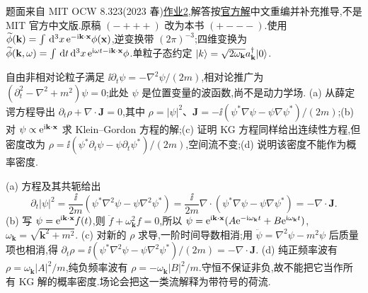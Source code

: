 题面来自 MIT OCW 8.323(2023 春)\href{https://ocw.mit.edu/courses/8-323-relativistic-quantum-field-theory-i-spring-2023/mit8_323_s23_pset02.pdf}{作业2},解答按\href{https://ocw.mit.edu/courses/8-323-relativistic-quantum-field-theory-i-spring-2023/mit8_323_s23_pset_02sol.pdf}{官方解}中文重编并补充推导,不是 MIT 官方中文版.原稿 $(-+++)$ 改为本书 $(+---)$.使用
$\widetilde\phi(\mathbf k)=\int\,\mathrm d^3x\,\mathrm e^{-\mathrm i\mathbf k\cdot\mathbf x}\phi(\mathbf x)$,逆变换带 $(2\pi)^{-3}$;四维变换为 $\widetilde\phi(\mathbf k,\omega)=\int\,\mathrm d t\,\mathrm d^3x\,\mathrm e^{\mathrm i\omega t-\mathrm i\mathbf k\cdot\mathbf x}\phi$.单粒子态约定 $\lvert k\rangle=\sqrt{2\omega_{\mathbf k}}a^\dagger_{\mathbf k}\lvert 0\rangle$.

\begin{exercise}
自由非相对论粒子满足 $\ii\partial_t\psi=-\nabla^2\psi/(2m)$,相对论推广为 $(\partial_t^2-\nabla^2+m^2)\psi=0$;此处 $\psi$ 是位置变量的波函数,尚不是动力学场.
(a) 从薛定谔方程导出 $\partial_t\rho+\nabla\cdot\mathbf J=0$,其中 $\rho=|\psi|^2$、$\mathbf J=-\ii(\psi^*\nabla\psi-\psi\nabla\psi^*)/(2m)$;(b) 对 $\psi\propto\mathrm e^{\mathrm i\mathbf k\cdot\mathbf x}$ 求 Klein--Gordon 方程的解;(c) 证明 KG 方程同样给出连续性方程,但密度改为 $\rho=\ii(\psi^*\partial_t\psi-\psi\partial_t\psi^*)/(2m)$,空间流不变;(d) 说明该密度不能作为概率密度.
\end{exercise}
\begin{solution}
(a) 方程及其共轭给出
\[
\partial_t|\psi|^2=\frac{\ii}{2m}(\psi^*\nabla^2\psi-\psi\nabla^2\psi^*)
=\frac{\ii}{2m}\nabla\cdot(\psi^*\nabla\psi-\psi\nabla\psi^*)=-\nabla\cdot\mathbf J.
\]
(b) 写 $\psi=\mathrm e^{\mathrm i\mathbf k\cdot\mathbf x}f(t)$,则 $\ddot f+\omega_{\mathbf k}^2f=0$,所以
$\psi=\mathrm e^{\mathrm i\mathbf k\cdot\mathbf x}(A\mathrm e^{-\mathrm i\omega_{\mathbf k}t}+B\mathrm e^{\mathrm i\omega_{\mathbf k}t})$,$\omega_{\mathbf k}=\sqrt{\mathbf k^2+m^2}$.
(c) 对新的 $\rho$ 求导,一阶时间导数相消;用 $\ddot\psi=\nabla^2\psi-m^2\psi$ 后质量项也相消,得
$\partial_t\rho=\ii(\psi^*\nabla^2\psi-\psi\nabla^2\psi^*)/(2m)=-\nabla\cdot\mathbf J$.
(d) 纯正频率波有 $\rho=\omega_{\mathbf k}|A|^2/m$,纯负频率波有 $\rho=-\omega_{\mathbf k}|B|^2/m$.守恒不保证非负,故不能把它当作所有 KG 解的概率密度.场论会把这一类流解释为带符号的荷流.
\end{solution}

